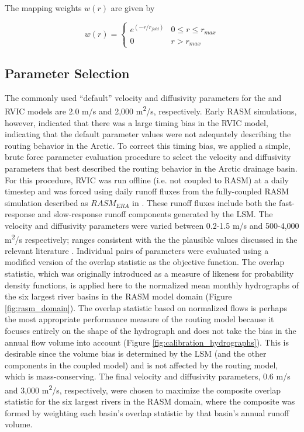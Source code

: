 \documentclass[jgrga, draft]{agutex}
\begin{document}
\begin{article}
The mapping weights $w(r)$ are given by

\begin{equation}
  \label{eq:diffusion}
  w(r)=
     \begin{cases}
        e^{(-r/r_{fold})} & 0\leq r\leq r_{max} \\
        0 & r > r_{max}
     \end{cases}
\end{equation}

\subsection{Parameter Selection}
\label{sec:parameters}

The commonly used ``default'' velocity and diffusivity parameters for the \citet{Lohmann_1996} and RVIC models are 2.0 m/s and 2,000 m\textsuperscript{2}/s, respectively.
Early RASM simulations, however, indicated that there was a large timing bias in the RVIC model, indicating that the default parameter values were not adequately describing the routing behavior in the Arctic.
To correct this timing bias, we applied a simple, brute force parameter evaluation procedure to select the velocity and diffusivity parameters that best described the routing behavior in the Arctic drainage basin.
For this procedure, RVIC was run offline (i.e. not coupled to RASM) at a daily timestep and was forced using daily runoff fluxes from the fully-coupled RASM simulation described as $RASM_{ERA}$ in \citet{Hamman_2016}.
These runoff fluxes include both the fast-response and slow-response runoff components generated by the LSM.
The velocity and diffusivity parameters were varied between 0.2-1.5 m/s and 500-4,000 m\textsuperscript{2}/s respectively; ranges consistent with the the plausible values discussed in the relevant literature \citep[e.g.][]{Decharme_2010,Lohmann_1996}.
Individual pairs of parameters were evaluated using a modified version of the overlap statistic \citep{Perkins_2007} as the objective function.
The overlap statistic, which was originally introduced as a measure of likeness for probability density functions, is applied here to the normalized mean monthly hydrographs of the six largest river basins in the RASM model domain (Figure \ref{fig:rasm_domain}).
The overlap statistic based on normalized flows is perhaps the most appropriate performance measure of the routing model because it focuses entirely on the shape of the hydrograph and does not take the bias in the annual flow volume into account (Figure \ref{fig:calibration_hydrographs}).
This is desirable since the volume bias is determined by the LSM (and the other components in the coupled model) and is not affected by the routing model, which is mass-conserving.
The final velocity and diffusivity parameters, 0.6 m/s and 3,000 m\textsuperscript{2}/s, respectively, were chosen to maximize the composite overlap statistic for the six largest rivers in the RASM domain, where the composite was formed by weighting each basin's overlap statistic by that basin's annual runoff volume.


\end{article}
\end{document}
